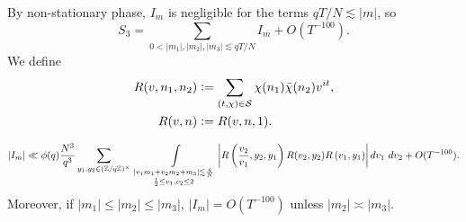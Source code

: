 By non-stationary phase, $I_m$ is negligible for the terms $qT/N\lesssim |m|$, so 
\begin{equation}
    S_3 = \sum_{0<|m_1|,|m_2|,|m_3|\lesssim qT/N} I_m + O(T^{-100}).
\end{equation}
We define \begin{align*}
    R(v,n_1,n_2)&\mathrel{\mathop:}= \sum_{(t,\chi)\in \mathcal{S}} 
    \chi({n_1})\bar{\chi}(n_2)v^{it},\\
    R(v,n)&\mathrel{\mathop:}= R(v,n,1).
\end{align*}
\begin{proposition}
    \label{doubleintegrals3}
    \[
    |I_m|\ll \phi(q) \frac{N^3}{q^3}  
    \sum_{y_1,y_2\in (\mathbb{Z}/q\mathbb{Z})^\times}\ \int\displaylimits_{\substack{
        |v_1m_1+v_2m_2+m_3|\lesssim \frac{q}{N}\\
        \frac{1}{2}\leq v_1,v_2\leq 2
    }} \left| R\left(\frac{v_2}{v_1},y_2,y_1\right)
    R(v_2,y_2)R\left(v_1,y_1\right)\right| dv_1 \ dv_2  + O(T^{-100}).\\
    \]
    Moreover, if $|m_1|\leq|m_2|\leq |m_3|$, $|I_m|=O(T^{-100})$ unless $|m_2|\asymp|m_3|$.
\end{proposition}
